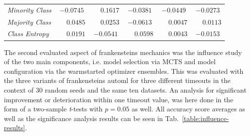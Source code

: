 \begin{table}[ht]
\begin{subtable}{\textwidth}
\begin{tabular}{l|ccccc}
            \textit{Minority Class} & $-0.0745$ & $\phantom{-}0.1617$ & $-0.0381$ & $-0.0449$ & $-0.0273$ \\
            \textit{Majority Class} & $\phantom{-}0.0485$ & $\phantom{-}0.0253$ & $-0.0613$ & $\phantom{-}0.0047$ & $\phantom{-}0.0113$ \\
            \textit{Class Entropy} & $\phantom{-}0.0191$ & $-0.0541$ & $\phantom{-}0.0598$ & $\phantom{-}0.0043$ & $-0.0153$ \\
            \hline
        \end{tabular}
    \end{subtable}
\end{table}

The second evaluated aspect of frankensteins mechanics was the influence study of the two main components, i.e. model selection via MCTS and model configuration via the warmstarted optimizer ensembles.\newline
This was evaluated with the three variants of frankensteins automl for three different timeouts in the context of 30 random seeds and the same ten datasets.
An analysis for significant improvement or deterioration within one timeout value, was here done in the form of a two-sample \textit{t}-tests with $p = 0.05$ as well.\newline
All accuracy score averages as well as the significance analysis results can be seen in Tab.~\ref{table:influence-results}.

